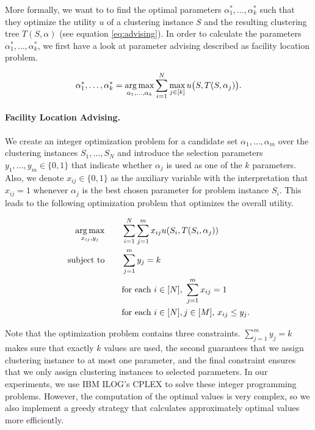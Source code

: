 More formally, we want to to find the optimal parameters $\alpha_1^*, \dots, \alpha_k^*$ such that they optimize the utility $u$ of a clustering instance $S$ and the resulting clustering tree $T(S, \alpha)$ (see equation \ref{eq:advising}). In order to calculate the parameters $\alpha_1^*, \dots, \alpha_k^*$, we first have a look at parameter advising described as facility location problem.

\begin{equation}
  \alpha_1^*, \dots, \alpha_k^*
  = \operatorname*{arg\,max}_{\alpha_1, \dots, \alpha_k} \sum_{i=1}^N \max_{j \in [k]} u\bigl(S, T(S, \alpha_j)\bigr).
  \label{eq:advising}
\end{equation}

\paragraph{Facility Location Advising.} We create an integer optimization problem for a candidate set $\alpha_1, \dots, \alpha_m$ over the clustering instances $S_1, \dots, S_N$ and introduce the selection parameters $y_1, \dots, y_m \in \{0, 1\}$ that indicate whether $\alpha_j$ is used as one of the $k$ parameters. Also, we denote $x_{ij} \in \{0, 1\}$ as the auxiliary variable with the interpretation that $x_{ij} = 1$ whenever $\alpha_j$ is the best chosen parameter for problem instance $S_i$. This leads to the following optimization problem that optimizes the overall utility.

\begin{align*}
  \operatorname*{arg\,max}_{x_{ij}, y_j} \qquad&\sum_{i = 1}^N \sum_{j = 1}^m x_{ij} u(S_i, T(S_i, \alpha_j)) \\
  \text{subject to} \qquad& \sum_{j=1}^m y_j = k \\
  & \text{for each $i \in [N]$, } \sum_{j=1}^m x_{ij} = 1 \\
  & \text{for each $i \in [N], j \in [M]$, } x_{ij} \leq y_j.
\end{align*}

Note that the optimization problem contains three constraints. $\sum_{j=1}^m y_j = k$ makes sure that exactly $k$ values are used, the second guarantees that we assign clustering instance to at most one parameter, and the final constraint ensures that we only assign clustering instances to selected parameters. In our experiments, we use IBM ILOG’s CPLEX to solve these integer programming problems. However, the computation of the optimal values is very complex, so we also implement a greedy strategy that calculates approximately optimal values more efficiently.

